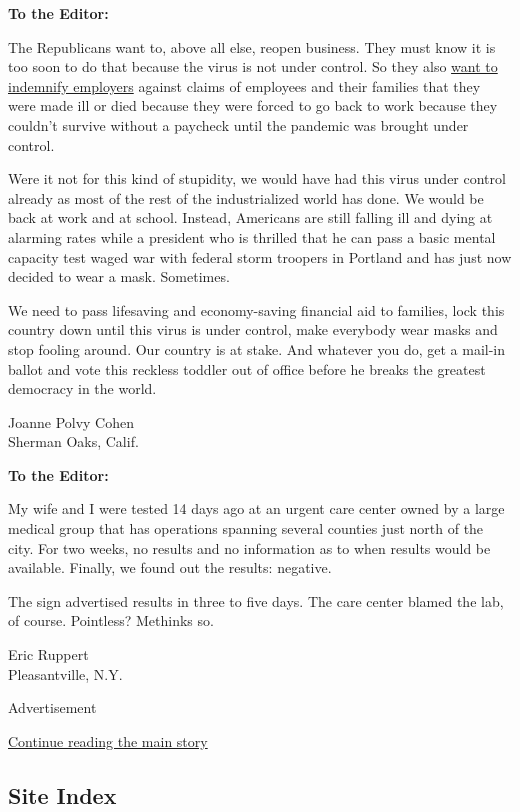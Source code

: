 \textbf{To the Editor:}

The Republicans want to, above all else, reopen business. They must know
it is too soon to do that because the virus is not under control. So
they also
\href{https://www.nytimes3xbfgragh.onion/2020/06/12/business/economy/coronavirus-liability-shield.html}{want
to indemnify employers} against claims of employees and their families
that they were made ill or died because they were forced to go back to
work because they couldn't survive without a paycheck until the pandemic
was brought under control.

Were it not for this kind of stupidity, we would have had this virus
under control already as most of the rest of the industrialized world
has done. We would be back at work and at school. Instead, Americans are
still falling ill and dying at alarming rates while a president who is
thrilled that he can pass a basic mental capacity test waged war with
federal storm troopers in Portland and has just now decided to wear a
mask. Sometimes.

We need to pass lifesaving and economy-saving financial aid to families,
lock this country down until this virus is under control, make everybody
wear masks and stop fooling around. Our country is at stake. And
whatever you do, get a mail-in ballot and vote this reckless toddler out
of office before he breaks the greatest democracy in the world.

Joanne Polvy Cohen\\
Sherman Oaks, Calif.

\textbf{To the Editor:}

My wife and I were tested 14 days ago at an urgent care center owned by
a large medical group that has operations spanning several counties just
north of the city. For two weeks, no results and no information as to
when results would be available. Finally, we found out the results:
negative.

The sign advertised results in three to five days. The care center
blamed the lab, of course. Pointless? Methinks so.

Eric Ruppert\\
Pleasantville, N.Y.

Advertisement

\protect\hyperlink{after-bottom}{Continue reading the main story}

\hypertarget{site-index}{%
\subsection{Site Index}\label{site-index}}

